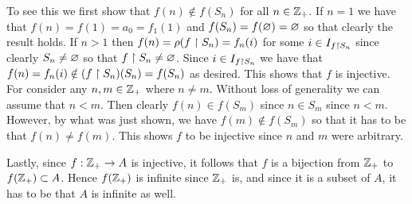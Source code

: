 {{    To see this we first show that $f(n) \notin f(S_n)$ for all $n \in {{\mathbb{Z}}_+}$.
    If $n = 1$ we have that $f(n) = f(1) = a_0 = f_1(1)$ and $f(S_n) = f(\varnothing) = \varnothing$ so that clearly the result holds.
    If $n > 1$ then $f(n) = \rho(f \restriction S_n) = f_n(i)$ for some $i \in I_{f \restriction S_n}$ since clearly $S_n \neq \varnothing$ so that $f \restriction S_n \neq \varnothing$.
    Since $i \in I_{f \restriction S_n}$ we have that $f(n) = f_n(i) \notin (f \restriction S_n)(S_n) = f(S_n)$ as desired.
    This shows that $f$ is injective.
    For consider any $n,m \in {{\mathbb{Z}}_+}$ where $n \neq m$.
    Without loss of generality we can assume that $n < m$.
    Then clearly $f(n) \in f(S_m)$ since $n \in S_m$ since $n < m$.
    However, by what was just shown, we have $f(m) \notin f(S_m)$ so that it has to be that $f(n) \neq f(m)$.
    This shows $f$ to be injective since $n$ and $m$ were arbitrary.

    Lastly, since $f: {{\mathbb{Z}}_+} \to A$ is injective, it follows that $f$ is a bijection from ${{\mathbb{Z}}_+}$ to $f({{\mathbb{Z}}_+}) \subset A$.
    Hence $f({{\mathbb{Z}}_+})$ is infinite since ${{\mathbb{Z}}_+}$ is, and since it is a subset of $A$, it has to be that $A$ is infinite as well.
  }
}
